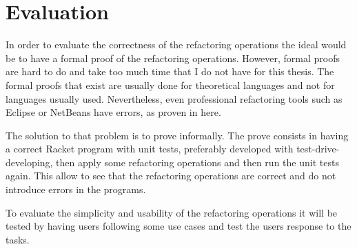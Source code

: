 
% 
% 

\section{Evaluation}


In order to evaluate the correctness of the refactoring operations the ideal would be to have a formal proof of the refactoring operations.
However, formal proofs are hard to do and take too much time that I do not have for this thesis.
The formal proofs that exist are usually done for theoretical languages and not for languages usually used.
Nevertheless, even professional refactoring tools such as Eclipse or NetBeans have errors, as proven in here. 

The solution to that problem is to prove informally. The prove consists in having a correct Racket program with unit tests, preferably developed with test-drive-developing, then apply some refactoring operations and then run the unit tests again. This allow to see that the refactoring operations are correct and do not introduce errors in the programs.

To evaluate the simplicity and usability of the refactoring operations it will be tested by having users following some use cases and test the users response to the tasks.